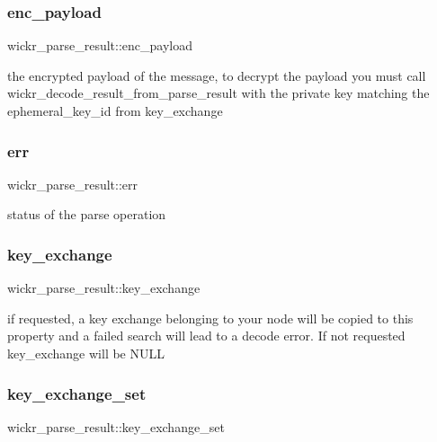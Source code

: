 \subsubsection{\texorpdfstring{enc\_payload}{enc\_payload}}
{\footnotesize\ttfamily wickr\+\_\+parse\+\_\+result\+::enc\+\_\+payload}

the encrypted payload of the message, to decrypt the payload you must call \textquotesingle{}wickr\+\_\+decode\+\_\+result\+\_\+from\+\_\+parse\+\_\+result\textquotesingle{} with the private key matching the \textquotesingle{}ephemeral\+\_\+key\+\_\+id\textquotesingle{} from \textquotesingle{}key\+\_\+exchange\textquotesingle{} \mbox{\label{structwickr__parse__result_a69a3ee332921b4fdbc0e07dbfa74a8ed}} 
\subsubsection{\texorpdfstring{err}{err}}
{\footnotesize\ttfamily wickr\+\_\+parse\+\_\+result\+::err}

status of the parse operation \mbox{\label{structwickr__parse__result_ab33e5d00121c229280bbee814ca7ef5a}} 
\subsubsection{\texorpdfstring{key\_exchange}{key\_exchange}}
{\footnotesize\ttfamily wickr\+\_\+parse\+\_\+result\+::key\+\_\+exchange}

if requested, a key exchange belonging to your node will be copied to this property and a failed search will lead to a decode error. If not requested key\+\_\+exchange will be N\+U\+LL \mbox{\label{structwickr__parse__result_aa35f9328b675b02426fd190ffcd45402}} 
\subsubsection{\texorpdfstring{key\_exchange\_set}{key\_exchange\_set}}
{\footnotesize\ttfamily wickr\+\_\+parse\+\_\+result\+::key\+\_\+exchange\+\_\+set}

